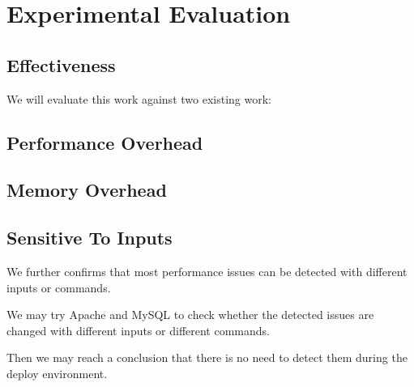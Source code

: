 \section{Experimental Evaluation}
\label{sec:evaluation}

\subsection{Effectiveness}
We will evaluate this work against two existing work:

%




\subsection{Performance Overhead}

\subsection{Memory Overhead}

\subsection{Sensitive To Inputs}
We further confirms that most performance issues can be detected with different inputs or commands. 

We may try Apache and MySQL to check whether the detected issues are changed with different inputs or different commands. 

Then we may reach a conclusion that there is no need to detect them during the deploy environment. 
